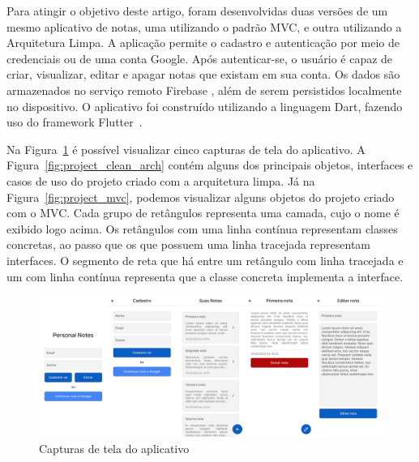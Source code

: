 Para atingir o objetivo deste artigo, foram desenvolvidas duas versões de um mesmo aplicativo de notas, uma utilizando o padrão MVC, e outra utilizando a Arquitetura Limpa.
A aplicação permite o cadastro e autenticação por meio de credenciais ou de uma conta Google.
Após autenticar-se, o usuário é capaz de criar, visualizar, editar e apagar notas que existam em sua conta.
Os dados são armazenados no serviço remoto Firebase \cite{firebase}, além de serem persistidos localmente no dispositivo.
O aplicativo foi construído utilizando a linguagem Dart, fazendo uso do framework Flutter~\cite{flutter}.

Na Figura~\ref{fig:screenshots} é possível visualizar cinco capturas de tela do aplicativo.
A Figura~\ref{fig:project_clean_arch} contém alguns dos principais objetos, interfaces e casos de uso do projeto criado com a arquitetura limpa.
Já na Figura~\ref{fig:project_mvc}, podemos visualizar alguns objetos do projeto criado com o MVC.
Cada grupo de retângulos representa uma camada, cujo o nome é exibido logo acima. 
Os retângulos com uma linha contínua representam classes concretas, ao passo que os que possuem uma linha tracejada representam interfaces.
O segmento de reta que há entre um retângulo com linha tracejada e um com linha contínua representa que a classe concreta implementa a interface.
\begin{figure}[ht]
	\centering
	\includegraphics[width=1\textwidth]{images/screenshots.png}
	\caption{Capturas de tela do aplicativo}
	\label{fig:screenshots}
\end{figure}

